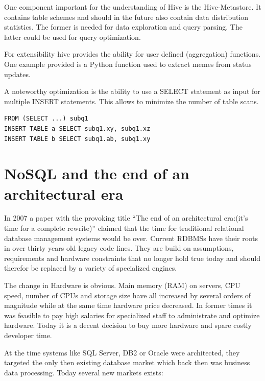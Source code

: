 \documentclass[12pt,a4paper]{scrartcl}		%
\begin{document}
One component important for the understanding of Hive is the Hive-Metastore. It contains table schemes and should in the future also contain data distribution statistics. The former is needed for data exploration and query parsing. The latter could be used for query optimization.

For extensibility hive provides the ability for user defined (aggregation) functions. One example provided is a Python function used to extract memes from status updates.

A noteworthy optimization is the ability to use a SELECT statement as input for multiple INSERT statements. This allows to minimize the number of table scans.

\begin{verbatim}
FROM (SELECT ...) subq1
INSERT TABLE a SELECT subq1.xy, subq1.xz
INSERT TABLE b SELECT subq1.ab, subq1.xy
\end{verbatim}

\newpage{}


















\section{NoSQL and the end of an architectural era}
In 2007 a paper with the provoking title ``The end of an architectural era:(it's time for a complete rewrite)''\cite{sto07} claimed that the time for traditional relational database management systems would be over. Current RDBMSs have their roots in over thirty years old legacy code lines. They are build on assumptions, requirements and hardware constraints that no longer hold true today and should therefor be replaced by a variety of specialized engines.

The change in Hardware is obvious. Main memory (RAM) on servers, CPU speed, number of CPUs and storage size have all increased by several orders of magnitude while at the same time hardware price decreased. In former times it was feasible to pay high salaries for specialized staff to administrate and optimize hardware. Today it is a decent decision to buy more hardware and spare costly developer time.

At the time systems like SQL Server, DB2 or Oracle were architected, they targeted the only then existing database market which back then was business data processing. Today several new markets exists:
\end{document}
